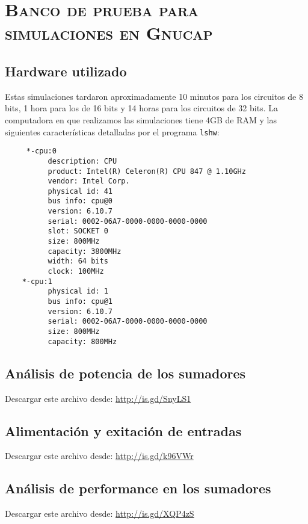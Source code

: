 \chapter{\textsc{ Banco de prueba para simulaciones en Gnucap}}\label{chap:gnucap_testbench}
\section{Hardware utilizado}
Estas simulaciones tardaron aproximadamente 10 minutos para los circuitos de 8 bits, 1 hora para los de 16 bits y 14 horas para los circuitos de 32 bits. La computadora en que realizamos las simulaciones tiene 4GB de RAM y las siguientes características detalladas  por el programa \verb.lshw.:
\begin{footnotesize}
\begin{verbatim}
     *-cpu:0
          description: CPU
          product: Intel(R) Celeron(R) CPU 847 @ 1.10GHz
          vendor: Intel Corp.
          physical id: 41
          bus info: cpu@0
          version: 6.10.7
          serial: 0002-06A7-0000-0000-0000-0000
          slot: SOCKET 0
          size: 800MHz
          capacity: 3800MHz
          width: 64 bits
          clock: 100MHz
    *-cpu:1
          physical id: 1
          bus info: cpu@1
          version: 6.10.7
          serial: 0002-06A7-0000-0000-0000-0000
          size: 800MHz
          capacity: 800MHz
\end{verbatim}
\end{footnotesize}
\section{Análisis de potencia de los sumadores}
\noindent Descargar este archivo desde: \url{http://is.gd/SnyLS1}


\section{Alimentación y exitación de entradas}
\noindent Descargar este archivo desde: \url{http://is.gd/k96VWr}


\section{Análisis de performance en los sumadores}
\noindent Descargar este archivo desde: \url{http://is.gd/XQP4zS}

